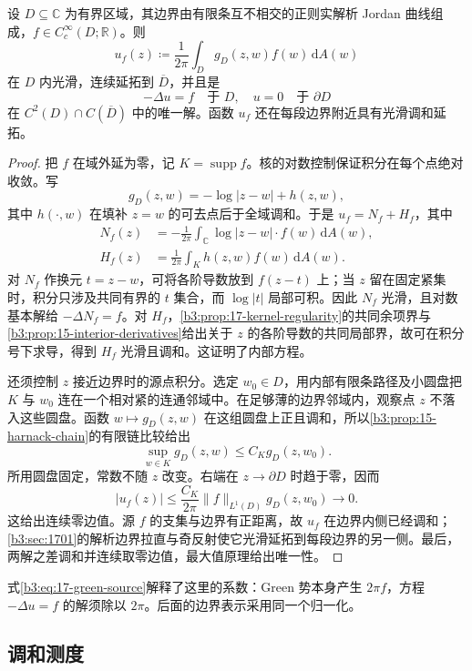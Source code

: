\begin{proposition}[光滑内部源的零边值解]\label{b3:prop:17-green-poisson-source}
设 \(D\subseteq\mathbb C\) 为有界区域，其边界由有限条互不相交的正则实解析 Jordan 曲线组成，\(f\in C_c^\infty(D;\mathbb R)\)。则
\[
 u_f(z)\coloneqq\frac1{2\pi}\int_Dg_D(z,w)f(w)\,\mathrm dA(w)
\]
在 \(D\) 内光滑，连续延拓到 \(\overline D\)，并且是
\[
 -\Delta u=f\quad\text{于 }D,
 \quad u=0\quad\text{于 }\partial D
\]
在 \(C^2(D)\cap C(\overline D)\) 中的唯一解。函数 \(u_f\) 还在每段边界附近具有光滑调和延拓。
\end{proposition}
\begin{proof}
把 \(f\) 在域外延为零，记 \(K=\operatorname{supp}f\)。核的对数控制保证积分在每个点绝对收敛。写
\[
 g_D(z,w)=-\log|z-w|+h(z,w),
\]
其中 \(h(\cdot,w)\) 在填补 \(z=w\) 的可去点后于全域调和。于是 \(u_f=N_f+H_f\)，其中
\[
 \begin{aligned}
 N_f(z)&=-\frac1{2\pi}\int_{\mathbb C}\log|z-w|\cdot f(w)\,\mathrm dA(w),\\
 H_f(z)&=\frac1{2\pi}\int_Kh(z,w)f(w)\,\mathrm dA(w).
 \end{aligned}
\]
对 \(N_f\) 作换元 \(t=z-w\)，可将各阶导数放到 \(f(z-t)\) 上；当 \(z\) 留在固定紧集时，积分只涉及共同有界的 \(t\) 集合，而 \(\log|t|\) 局部可积。因此 \(N_f\) 光滑，且对数基本解给 \(-\Delta N_f=f\)。对 \(H_f\)，\cref{b3:prop:17-kernel-regularity}的共同余项界与\cref{b3:prop:15-interior-derivatives}给出关于 \(z\) 的各阶导数的共同局部界，故可在积分号下求导，得到 \(H_f\) 光滑且调和。这证明了内部方程。

还须控制 \(z\) 接近边界时的源点积分。选定 \(w_0\in D\)，用内部有限条路径及小圆盘把 \(K\) 与 \(w_0\) 连在一个相对紧的连通邻域中。在足够薄的边界邻域内，观察点 \(z\) 不落入这些圆盘。函数 \(w\mapsto g_D(z,w)\) 在这组圆盘上正且调和，所以\cref{b3:prop:15-harnack-chain}的有限链比较给出
\[
 \sup_{w\in K}g_D(z,w)\le C_Kg_D(z,w_0).
\]
所用圆盘固定，常数不随 \(z\) 改变。右端在 \(z\to\partial D\) 时趋于零，因而
\[
 |u_f(z)|\le\frac{C_K}{2\pi}\|f\|_{L^1(D)}g_D(z,w_0)\longrightarrow0.
\]
这给出连续零边值。源 \(f\) 的支集与边界有正距离，故 \(u_f\) 在边界内侧已经调和；\cref{b3:sec:1701}的解析边界拉直与奇反射使它光滑延拓到每段边界的另一侧。最后，两解之差调和并连续取零边值，最大值原理给出唯一性。
\end{proof}

式\eqref{b3:eq:17-green-source}解释了这里的系数：Green 势本身产生 \(2\pi f\)，方程 \(-\Delta u=f\) 的解须除以 \(2\pi\)。后面的边界表示采用同一个归一化。

\subsection{调和测度}
\label{b3:subsec:170402}

